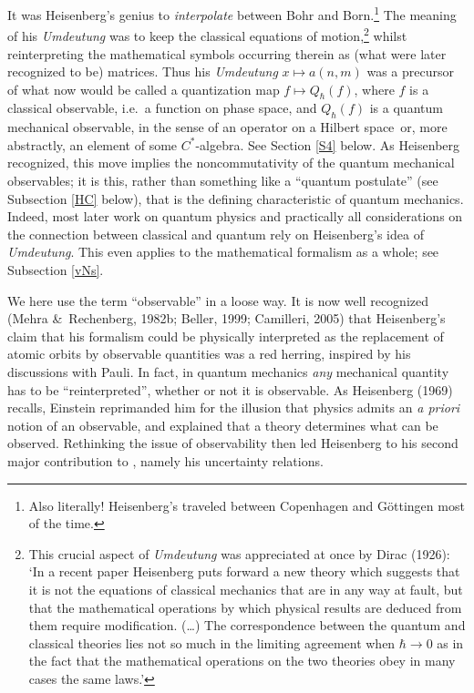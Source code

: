 \documentclass[12pt,titlepage]{article}
\newcommand{\ca}{$C^*$-algebra} \newcommand{\jba}{JB-algebra}
\newcommand{\Hs}{Hilbert space} \newcommand{\Bs}{Banach space}
\newcommand{\raw}{\rightarrow} \newcommand{\rat}{\mapsto}
\begin{document}
It was Heisenberg's genius to {\it interpolate} between Bohr and Born.\footnote{Also literally!  Heisenberg's traveled between Copenhagen and G\"{o}ttingen most of the time.} The meaning of his \textit{Umdeutung}  was to keep the classical equations of motion,\footnote{This crucial aspect of  \textit{Umdeutung} was appreciated at once by Dirac (1926): `In a recent paper Heisenberg puts forward a new theory which suggests that  it is not the equations of classical mechanics that are in any way at fault, but that the mathematical operations by which physical results are deduced from them require modification. (\ldots)  The correspondence between the quantum and classical theories lies not so much in the limiting agreement when $\hbar\raw 0$ as in the fact that the mathematical operations on the two theories obey in many cases the same laws.'}  whilst reinterpreting the mathematical symbols occurring therein as (what were later recognized to be) matrices. Thus his \textit{Umdeutung} $x\mapsto a(n,m)$ was a precursor of what now would be called a quantization map $f\mapsto Q_{\hbar}(f)$, where $f$ is a classical observable, i.e.\ a function on phase space, and $Q_{\hbar}(f)$ is a quantum mechanical observable, in the sense of an operator on a \Hs\ or, more abstractly, an element of some \ca. See Section \ref{S4} below. 
As Heisenberg recognized, this move implies the noncommutativity of the quantum mechanical observables; it is this, rather than something like a ``quantum postulate'' (see Subsection \ref{HC} below), that is the defining characteristic of quantum mechanics. Indeed, most later work on quantum physics and practically all considerations on the connection between classical and quantum rely on Heisenberg's idea of \textit{Umdeutung}. This even applies to the mathematical formalism as a whole; see Subsection \ref{vNs}. 

We here use the term ``observable'' in a loose way. It is now well recognized (Mehra \&\ Rechenberg, 1982b; Beller, 1999; Camilleri, 2005) that Heisenberg's claim that his formalism could be physically interpreted as the replacement of atomic orbits by observable quantities was a red herring, inspired by his discussions with Pauli.
 In fact, in quantum mechanics \textit{any} mechanical quantity has to be ``reinterpreted'', whether or not it is observable. As Heisenberg (1969) recalls, Einstein reprimanded him for the illusion that physics admits an \textit{a priori} notion of an observable, and explained that a theory determines what can be observed. Rethinking the issue of observability then led Heisenberg to his second major contribution to \qm, namely his uncertainty relations. 
\end{document}
